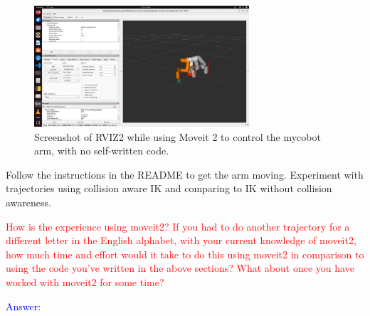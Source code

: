 \documentclass[11pt,a4paper]{article}
\begin{document}
\begin{figure}[h]
\includegraphics[width=8cm]{figures/moveit2_cobot.png}
\centering
\caption{Screenshot of RVIZ2 while using Moveit 2 to control the mycobot arm, with no self-written code.}
\label{moveit2_cobot}
\end{figure}

Follow the instructions in the README to get the arm moving. Experiment with trajectories using collision aware IK and comparing to IK without collision awareness.


\textcolor{red}{How is the experience using moveit2? If you had to do another trajectory for a different letter in the English alphabet, with your current knowledge of moveit2, how much time and effort would it take to do this using moveit2 in comparison to using the code you've written in the above sections? What about once you have worked with moveit2 for some time?}

\textcolor{blue}{Answer: }

\clearpage



\end{document}
